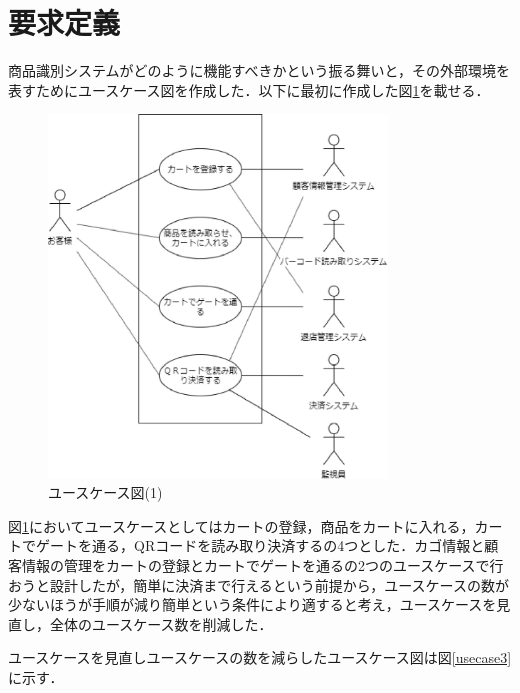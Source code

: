 

\section{要求定義}


商品識別システムがどのように機能すべきかという振る舞いと，その外部環境を表すためにユースケース図を作成した．以下に最初に作成した図\ref{usecase1}を載せる．

\begin{figure}[htbp]
\centering
\includegraphics[width = 9cm]{./picture/usecase1.eps}
\caption{ユースケース図(1)}
\label{usecase1}
\end{figure}


図\ref{usecase1}においてユースケースとしてはカートの登録，商品をカートに入れる，カートでゲートを通る，QRコードを読み取り決済するの4つとした．カゴ情報と顧客情報の管理をカートの登録とカートでゲートを通るの2つのユースケースで行おうと設計したが，簡単に決済まで行えるという前提から，ユースケースの数が少ないほうが手順が減り簡単という条件により適すると考え，ユースケースを見直し，全体のユースケース数を削減した．


ユースケースを見直しユースケースの数を減らしたユースケース図は図\ref{usecase3}に示す．

